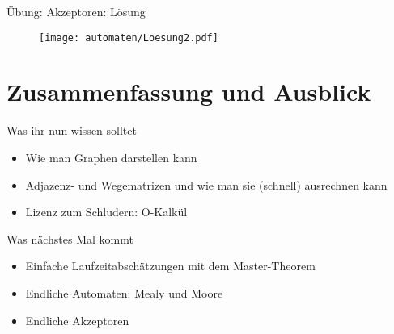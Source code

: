 \begin{frame}{Übung: Akzeptoren: Lösung}
	\begin{figure}
		\centering
		\texttt{[image: automaten/Loesung2.pdf]}
	\end{figure}
\end{frame}





\appendix
\beginbackup

\section{Zusammenfassung und Ausblick}

\begin{frame}
	\begin{block}{Was ihr nun wissen solltet}
		\begin{itemize}
			\item Wie man Graphen darstellen kann
			\item Adjazenz- und Wegematrizen und wie man sie (schnell) ausrechnen kann
			\item Lizenz zum Schludern: O-Kalkül
		\end{itemize}
	\end{block}
	
	\begin{block}{Was nächstes Mal kommt}
		\begin{itemize}
			\item Einfache Laufzeitabschätzungen mit dem Master-Theorem
			\item Endliche Automaten: Mealy und Moore
			\item Endliche Akzeptoren
		\end{itemize}
	\end{block}
\end{frame}






\backupend
